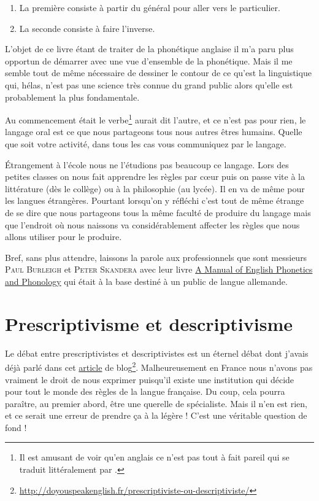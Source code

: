 \begin{enumerate}
\item La première consiste à partir du général  pour aller vers le
  particulier.
\item La seconde consiste à faire l'inverse.  
\end{enumerate}

 L'objet de ce livre étant de traiter de la phonétique anglaise il m'a
 paru plus opportun de démarrer avec une vue d'ensemble de la
 phonétique. Mais il me semble tout de même nécessaire de dessiner le
 contour de ce qu'est la linguistique qui, hélas, n'est pas une
 science très connue du grand public alors qu'elle est probablement la
 plus fondamentale.

 Au commencement était le verbe\footnote{Il est amusant de voir qu'en
   anglais ce n'est pas tout à fait pareil  qui se traduit littéralement par .} aurait dit l'autre, et ce n'est pas pour
 rien, le langage oral est ce que nous partageons tous nous autres
 êtres humains. Quelle que soit votre activité, dans tous les cas vous
 communiquez par le langage.

 \'Etrangement à l'école nous ne l'étudions pas beaucoup ce
 langage. Lors des petites classes on nous fait apprendre les règles
 par c{\oe}ur puis on passe vite à la littérature (dès le collège) ou
 à la philosophie (au lycée). Il en va de même pour les langues
 étrangères. Pourtant lorsqu'on y réfléchi c'est tout de même étrange
 de se dire que nous partageons tous la même faculté de produire du
 langage mais que l'endroit où nous naissons va considérablement
 affecter les règles que nous allons utiliser pour le produire.

 Bref, sans plus attendre, laissons la parole aux professionnels que sont
 messieurs \textsc{Paul Burleigh} et \textsc{Peter Skandera} avec leur
 livre \href{https://amzn.to/2HV8BzG}{A Manual of English Phonetics and
  Phonology} qui était à la base destiné à un public de langue allemande.

\newpage
\minitoc
\newpage

\section{Prescriptivisme et descriptivisme}

Le débat entre prescriptivistes et descriptivistes est un éternel
débat dont j'avais déjà parlé dans cet
\href{http://doyouspeakenglish.fr/prescriptiviste-ou-descriptiviste/}{article}
de
blog\footnote{\url{http://doyouspeakenglish.fr/prescriptiviste-ou-descriptiviste/}}. Malheureusement
en France nous n'avons pas vraiment le droit de nous exprimer
puisqu'il existe une institution qui décide pour tout le monde des
règles de la langue française. Du coup, cela pourra paraître, au
premier abord, être une querelle de spécialiste. Mais il n'en est
rien, et ce serait une erreur de prendre ça à la légère ! C'est une
véritable question de fond !

